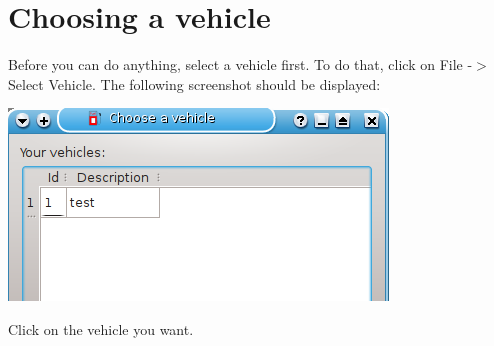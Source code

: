\chapter{Choosing a vehicle}
Before you can do anything, select a vehicle first.  To do that, click on 
File -$>$ Select Vehicle.  The following screenshot should be displayed:
  \begin{center}
    \includegraphics{snapshot5}
  \end{center}
Click on the vehicle you want.

